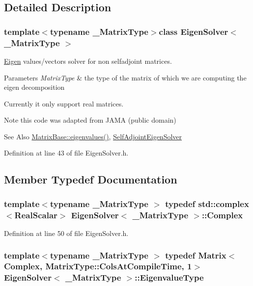 \subsection{Detailed Description}
\subsubsection*{template$<$typename \-\_\-\-Matrix\-Type$>$class Eigen\-Solver$<$ \-\_\-\-Matrix\-Type $>$}

\hyperlink{namespace_eigen}{Eigen} values/vectors solver for non selfadjoint matrices. 


\begin{DoxyParams}{Parameters}
{\em Matrix\-Type} & the type of the matrix of which we are computing the eigen decomposition\\
\hline
\end{DoxyParams}
Currently it only support real matrices.

\begin{DoxyNote}{Note}
this code was adapted from J\-A\-M\-A (public domain)
\end{DoxyNote}
\begin{DoxySeeAlso}{See Also}
\hyperlink{class_matrix_base_a335e48e1808d344d8f23ab4cfc5a62b7}{Matrix\-Base\-::eigenvalues()}, \hyperlink{class_self_adjoint_eigen_solver}{Self\-Adjoint\-Eigen\-Solver} 
\end{DoxySeeAlso}


Definition at line 43 of file Eigen\-Solver.\-h.



\subsection{Member Typedef Documentation}
\hypertarget{class_eigen_solver_a5fef085778f87f8104a5226b9cd80933}{
\subsubsection[{Complex}]{\setlength{\rightskip}{0pt plus 5cm}template$<$typename \-\_\-\-Matrix\-Type $>$ typedef std\-::complex$<${\bf Real\-Scalar}$>$ {\bf Eigen\-Solver}$<$ \-\_\-\-Matrix\-Type $>$\-::{\bf Complex}}}\label{class_eigen_solver_a5fef085778f87f8104a5226b9cd80933}


Definition at line 50 of file Eigen\-Solver.\-h.

\hypertarget{class_eigen_solver_abeff77daec5eb8f177c90adc13a4fba0}{
\subsubsection[{Eigenvalue\-Type}]{\setlength{\rightskip}{0pt plus 5cm}template$<$typename \-\_\-\-Matrix\-Type $>$ typedef {\bf Matrix}$<${\bf Complex}, Matrix\-Type\-::\-Cols\-At\-Compile\-Time, 1$>$ {\bf Eigen\-Solver}$<$ \-\_\-\-Matrix\-Type $>$\-::{\bf Eigenvalue\-Type}}}\label{class_eigen_solver_abeff77daec5eb8f177c90adc13a4fba0}



